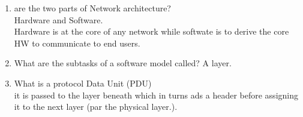 \begin{enumerate}
    \item are the two parts of Network architecture?\\
          Hardware and Software.\\
          Hardware is at the core of any network while softwate is to derive the core HW to communicate to end users.

    \item What are the subtasks of a software model called?
          A layer.\\

    \item What is a protocol Data Unit (PDU)\\
          it is passed to the layer beneath which in turns ads a header before assigning it to the next layer (par the physical layer.).

\end{enumerate}

